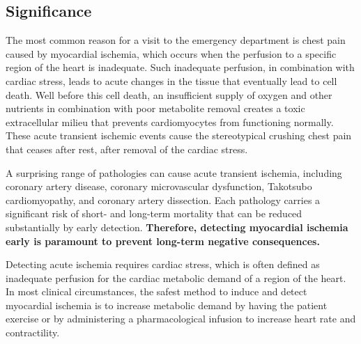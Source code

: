 \subsection{Significance}
\label{sec:signif}

The most common reason for a visit to the emergency department is chest
pain caused by myocardial ischemia\cite{BLZ:Saf2018,BLZ:Bhu2010},
which occurs when the perfusion to a specific region of the
heart is inadequate.\cite{BMB:Hea94,BMB:Fal2007} Such inadequate perfusion,
in combination with cardiac stress, leads to acute changes in the tissue
that eventually lead to cell death. Well before this cell death,
an insufficient supply of oxygen and other nutrients in combination with poor
metabolite removal creates a toxic extracellular milieu that prevents
cardiomyocytes from functioning normally.\cite{BMB:Kat2011,BMB:Foz86} These
acute transient ischemic events cause the stereotypical crushing chest pain
that ceases after rest, \ie{} after removal of the cardiac
stress.\cite{BMB:Kat2011,BMB:Sur2011b}

A surprising range of pathologies can cause acute transient ischemia,
including coronary artery disease, coronary microvascular dysfunction,
Takotsubo cardiomyopathy, and coronary artery dissection.\cite{BLZ:Saf2018,BLZ:Jes2013,BLZ:Noe2017,BLZ:Jes2012} Each
pathology carries a significant risk of short- and long-term mortality that
can be reduced substantially by early detection.\cite{BLZ:Noe2017}
\textbf{Therefore, detecting myocardial ischemia early is paramount to prevent
  long-term negative consequences.}
\cite{BMB:Kon99,BLZ:Saf2018,BLZ:Knu2018a}

Detecting acute ischemia requires cardiac stress, which is often defined
as inadequate perfusion for the cardiac metabolic demand of a region of the
heart.\cite{BLZ:Pue2004} In most clinical circumstances, the safest method
to induce and detect myocardial ischemia is to increase metabolic demand by
having the patient exercise or by administering a pharmacological infusion
to increase heart rate and
contractility.\cite{RSM:Ste2002,BLZ:Saf2018,BLZ:Knu2018a}

